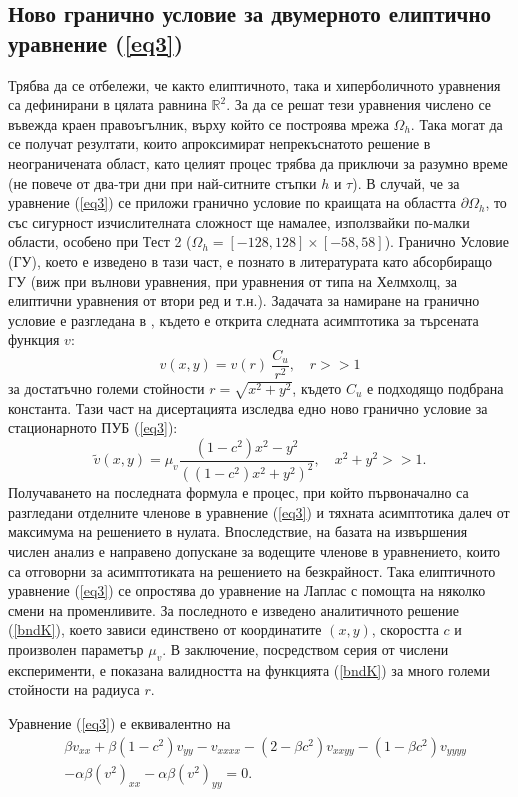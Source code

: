 \documentclass{article}
\newcommand{\be}{\begin{equation}}
\newcommand{\ee}{\end{equation}}
\newcommand{\rf}[1]{(\ref{#1})}
\newcommand{\RR}{\mathbb{R}}
\theoremstyle{remark}
\begin{document}
\subsection{Ново гранично условие за двумерното елиптично уравнение \rf{eq3}}
Трябва да се отбележи, че както елиптичното, така и хиперболичното уравнения са дефинирани в цялата равнина $\RR^2$. За да се решат тези уравнения числено се въвежда краен правоъгълник, върху който се построява мрежа $\Omega_h$. Така могат да се получат резултати, които апроксимират непрекъснатото решение в неограничената област, като целият процес трябва да приключи за разумно време (не повече от два-три дни при най-ситните стъпки $h$ и $\tau$). В случай, че за уравнение \rf{eq3} се приложи гранично условие по краищата на областта $\partial \Omega_h$, то със сигурност изчислителната сложност ще намалее, използвайки по-малки области, особено при Тест 2 ($\Omega_h = [-128, 128] \times [-58, 58]$). Гранично Условие (ГУ), което е изведено в тази част, е познато в литературата като абсорбиращо ГУ (виж \cite{ref31} при вълнови уравнения, \cite{ref32} при уравнения от типа на Хелмхолц, \cite{ref33} за елиптични уравнения от втори ред и т.н.). Задачата за намиране на гранично условие е разгледана в \cite{ref116}, където е открита следната асимптотика за търсената функция $v$:
\be
v(x,y) = v(r) ~ \frac{C_u}{r^2}, \quad r>>1
\ee
за достатъчно големи стойности $r = \sqrt{x^2 + y^2}$, където $C_u$ е подходящо подбрана константа. Тази част на дисертацията изследва едно ново гранично условие за стационарното ПУБ \rf{eq3}:
\be\label{bndK}
\tilde v(x,y) = \mu_v \frac{ (1-c^2)x^2 - y^2}{ ((1-c^2)x^2 + y^2)^2}, \quad x^2 + y^2 >> 1.
\ee
Получаването на последната формула е процес, при който първоначално са разгледани отделните членове в уравнение \rf{eq3} и тяхната асимптотика далеч от максимума на решението в нулата. Впоследствие, на базата на извършения числен анализ е направено допускане за водещите членове в уравнението, които са отговорни за асимптотиката на решението на безкрайност. Така елиптичното уравнение \rf{eq3} се опростява до уравнение на Лаплас с помощта на няколко смени на променливите. За последното е изведено аналитичното решение \rf{bndK}, което зависи единствено от координатите $(x,y)$, скоростта $c$ и произволен параметър $\mu_v$. В заключение, посредством серия от числени експерименти, е показана валидността на функцията \rf{bndK} за много големи стойности на радиуса $r$. 

Уравнение \rf{eq3} е еквивалентно на 
\begin{align}\label{eq3full}
&\beta v_{xx} + \beta (1-c^2) v_{yy} - v_{xxxx} - (2-\beta c^2)v_{xxyy} - (1-\beta c^2)v_{yyyy} \nonumber \\ 
&- \alpha \beta (v^2)_{xx} - \alpha \beta (v^2)_{yy}  =0.
\end{align}
\end{document}
